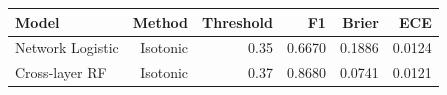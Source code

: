 \begin{tabular}{lrrrrr}
\toprule
Model & Method & Threshold & F1 & Brier & ECE \\
\midrule
Network Logistic & Isotonic & 0.35 & 0.6670 & 0.1886 & 0.0124 \\
Cross-layer RF & Isotonic & 0.37 & 0.8680 & 0.0741 & 0.0121 \\
\bottomrule
\end{tabular}

